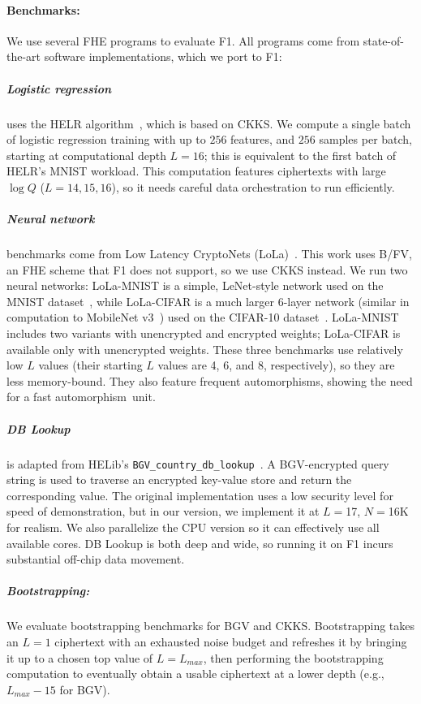 \paragraph{Benchmarks:}
We use several FHE programs to evaluate F1. All programs come from
state-of-the-art software implementations, which we port to F1:

\subparagraph{Logistic regression}
uses the HELR algorithm~\cite{han:aaai19:logistic}, which is based on CKKS. We
compute a single batch of logistic regression training with up to $256$
features, and $256$ samples per batch, starting at computational depth $L =
16$; this is equivalent to the first batch of HELR's MNIST workload. This
computation features ciphertexts with large $\log Q$ ($L = 14,15,16$), so it
needs careful data orchestration to run efficiently.

\subparagraph{Neural network} benchmarks come from Low Latency CryptoNets
(LoLa)~\cite{brutzkus:icml19:low}. This work uses B/FV, an FHE scheme that F1
does not support, so we use CKKS instead. We run two neural networks:
LoLa-MNIST is a simple, LeNet-style network used on the MNIST
dataset~\cite{lecunn:ieee98:gradient-document}, while LoLa-CIFAR is a much
larger 6-layer network (similar in computation to MobileNet
v3~\cite{howard2019searching}) used on the CIFAR-10 dataset~\cite{cifar10}.
LoLa-MNIST includes two variants with unencrypted and encrypted weights;
LoLa-CIFAR is available only with unencrypted weights. These three benchmarks
use relatively low $L$ values (their starting $L$ values are 4, 6, and 8,
respectively), so they are less memory-bound. They also feature frequent
automorphisms, showing the need for a fast automorphism~unit.

\tblFOneGF

\subparagraph{DB Lookup} is adapted from HELib's
\texttt{BGV\_country\_db\_lookup}~\cite{helib:db-lookup}. A BGV-encrypted query
string is used to traverse an encrypted key-value store and return the
corresponding value. The original implementation uses a low security level for
speed of demonstration, but in our version, we implement it at $L=$17, $N=$16K
for realism. We also parallelize the CPU version so it can effectively use all
available cores. DB Lookup is both deep and wide, so running it on F1 incurs
substantial off-chip data movement.


\subparagraph{Bootstrapping:} We evaluate bootstrapping benchmarks for BGV and
CKKS. Bootstrapping takes an $L=1$ ciphertext with an exhausted noise budget
and refreshes it by bringing it up to a chosen top value of $L=L_{max}$, then
performing the bootstrapping computation to eventually obtain a usable
ciphertext at a lower depth (e.g., $L_{max} - 15$ for BGV).

